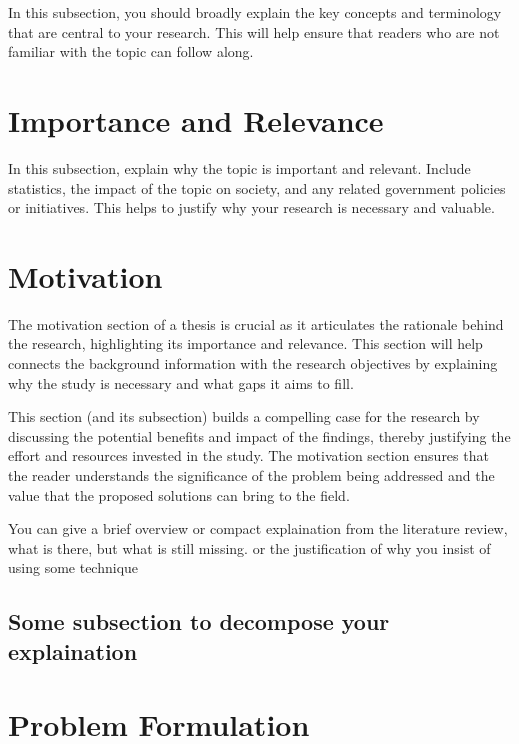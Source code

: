 In this subsection, you should broadly explain the key concepts and terminology that are central to your research. This will help ensure that readers who are not familiar with the topic can follow along.




\section{ Importance and Relevance} 
\label{SplitScheduleExplain}

In this subsection, explain why the topic is important and relevant. Include statistics, the impact of the topic on society, and any related government policies or initiatives. This helps to justify why your research is necessary and valuable.




\section{Motivation}

The motivation section of a thesis is crucial as it articulates the rationale behind the research, highlighting its importance and relevance. This section will help connects the background information with the research objectives by explaining why the study is necessary and what gaps it aims to fill. 

This section (and its subsection) builds a compelling case for the research by discussing the potential benefits and impact of the findings, thereby justifying the effort and resources invested in the study. The motivation section ensures that the reader understands the significance of the problem being addressed and the value that the proposed solutions can bring to the field.

You can give a brief overview or compact explaination from the literature review, what is there, but what is still missing. or the justification of why you insist of using some technique


\subsection{Some subsection to decompose your explaination}




\section{Problem Formulation}


